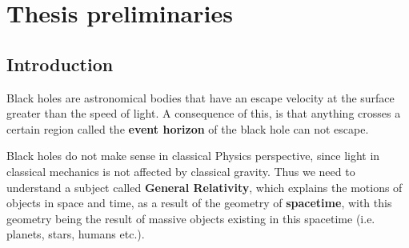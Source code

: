 



% 



\chapter{Thesis preliminaries}

\section{Introduction}

Black holes are astronomical bodies that have an escape velocity at the surface greater than the speed of light. A consequence of this, is that anything crosses a certain region called the \textbf{event horizon} of the black hole can not escape. 

Black holes do not make sense in classical Physics perspective, since light in classical mechanics is not affected by classical gravity. Thus we need to understand a subject called \textbf{General Relativity}, which explains the motions of objects in space and time, as a result of the geometry of \textbf{spacetime}, with this geometry being the result of massive objects existing in this spacetime (i.e. planets, stars, humans etc.). 

